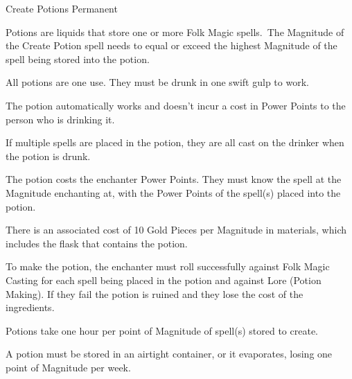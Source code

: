\begin{rpg-spell}
{Create Potions}
{Permanent}

Potions are liquids that store one or more Folk Magic spells. The Magnitude of the Create Potion spell needs to equal or exceed the highest Magnitude of the spell being stored into the potion.

\begin{rpg-list}
\item All potions are one use. They must be drunk in one swift gulp to work. 
\item The potion automatically works and doesn’t incur a cost in Power Points to the person who is drinking it. 
\item If multiple spells are placed in the potion, they are all cast on the drinker when the potion is drunk.
\item The potion costs the enchanter Power Points. They must know the spell at the Magnitude enchanting at, with the Power Points of the spell(s) placed into the potion. 
\item There is an associated cost of 10 Gold Pieces per Magnitude in materials, which includes the flask that contains the potion. 
\item To make the potion, the enchanter must roll successfully against Folk Magic Casting for each spell being placed in the potion and against Lore (Potion Making). If they fail the potion is ruined and they lose the cost of the ingredients. 
\item Potions take one hour per point of Magnitude of spell(s) stored to create. 
\item A potion must be stored in an airtight container, or it evaporates, losing one point of Magnitude per week. 
\end{rpg-list}
\end{rpg-spell}



